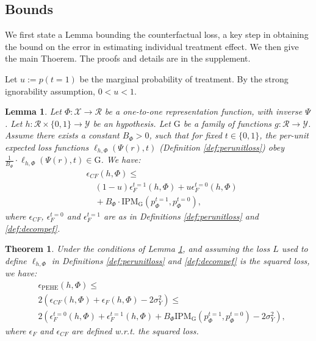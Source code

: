 \documentclass{article}
\newtheorem{thmlem}{Lemma}
\newtheorem{thmthm}{Theorem}
\def\cX{\mathcal X}
\def\cY{\mathcal Y}
\def\cF{\mathrm{G}}
\def\cR{\mathcal{R}}
\def \epehe{\epsilon_{\text{PEHE}}}
\newcommand{\pc}{p^{t=0}}
\newcommand{\pt}{p^{t=1}}
\newcommand{\lythr}{\ell_{h,\Phi}(\Psi(r),t)}
\begin{document}
\subsection{Bounds}

We first state a Lemma bounding the counterfactual loss, a key step in obtaining the bound on the error in estimating individual treatment effect. We then give the main Thoerem. The proofs and details are in the supplement.

Let $u := p(t=1)$ be the marginal probability of treatment. By the strong ignorability assumption, $0<u<1$.

\begin{thmlem}\label{lem:gen}
Let $\Phi : \cX \rightarrow \cR$ be a one-to-one representation function, with inverse $\Psi$.
Let $h : \cR \times \{0,1\} \rightarrow \cY$ be an hypothesis. Let $\cF$ be a family of functions $g: \cR \rightarrow \cY$. Assume there exists a constant $B_\Phi>0$, such that for fixed $t \in \{0,1\}$, the per-unit expected loss functions $\lythr$ (Definition \ref{def:perunitloss}) obey $ \frac{1}{B_\Phi} \cdot  \lythr \in \cF$. We have:
\begin{align*}
&\epsilon_{CF}(h,\Phi) \leq \nonumber \\
&\quad (1-u)  \epsilon^{t=1}_F(h,\Phi) + u  \epsilon^{t=0}_F(h,\Phi) \nonumber \\
&  \quad + B_\Phi \cdot \text{IPM}_\cF\left( \pt_\Phi, \pc_\Phi \right),
\end{align*}
where $\epsilon_{CF}$, $ \epsilon^{t=0}_F$ and $ \epsilon^{t=1}_F$ are as in Definitions \ref{def:perunitloss} and \ref{def:decompef}.
\end{thmlem}


\begin{thmthm}\label{thm:gen}
Under the conditions of Lemma \ref{lem:gen}, and assuming the loss $L$ used to define $\ell_{h,\Phi}$ in Definitions \ref{def:perunitloss} and \ref{def:decompef} is the squared loss, we have:
\begin{align}
&\epehe(h,\Phi) \leq  \nonumber \\
& 2\!\left(\epsilon_{CF}(h,\Phi) + \epsilon_F(h,\Phi) - 2\sigma^2_Y \right) \leq  \label{eq:thm_gen} \\
&2\!\left(\epsilon_F^{t=0}(h,\Phi)\! +\!\epsilon_F^{t=1}(h,\Phi)\!+ \! B_\Phi  \text{IPM}_\cF \left( \pt_\Phi, \pc_\Phi \right)\! -\! 2\sigma^2_Y\right)\!, \nonumber
\end{align}
where $\epsilon_F$ and $\epsilon_{CF}$ are defined w.r.t. the squared loss.
\end{thmthm}
\end{document}
